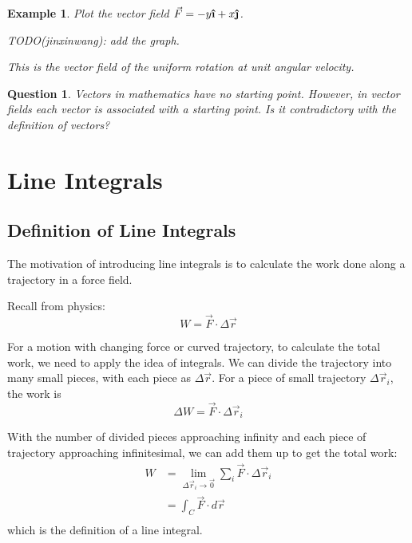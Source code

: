\documentclass{article}
\newtheorem{example}{Example}
\newtheorem*{question}{Question}
\newcommand{\uvec}[1]{\boldsymbol{\hat{\textbf{#1}}}}
\begin{document}
\begin{example}
  Plot the vector field $\vec{F} = -y \uvec{\i} + x \uvec{\j}$.

  TODO(jinxinwang): add the graph.

  This is the vector field of the uniform rotation at unit angular velocity.
\end{example}

\begin{question}
  Vectors in mathematics have no starting point. However, in vector fields each 
  vector is associated with a starting point. Is it contradictory with the 
  definition of vectors?
\end{question}

\section{Line Integrals}

\subsection{Definition of Line Integrals}

The motivation of introducing line integrals is to calculate the work done along 
a trajectory in a force field.

Recall from physics:
\begin{equation*}
  W = \vec{F} \cdot \Delta \vec{r}
\end{equation*}

For a motion with changing force or curved trajectory, to calculate the total 
work, we need to apply the idea of integrals. We can divide the trajectory into 
many small pieces, with each piece as $\Delta \vec{r}$. For a piece of small 
trajectory $\Delta \vec{r}_i$, the work is
\begin{equation*}
  \Delta W = \vec{F} \cdot \Delta \vec{r}_i
\end{equation*}

With the number of divided pieces approaching infinity and each piece of 
trajectory approaching infinitesimal, we can add them up to get the total work:
\begin{equation*}
  \begin{split}
    W &= \lim_{\Delta \vec{r}_i \to \vec{0}} \sum_i \vec{F} \cdot \Delta \vec{r}_i \\
      &= \int_C \vec{F} \cdot d\vec{r} \\
  \end{split}
\end{equation*}
which is the definition of a line integral.
\end{document}
